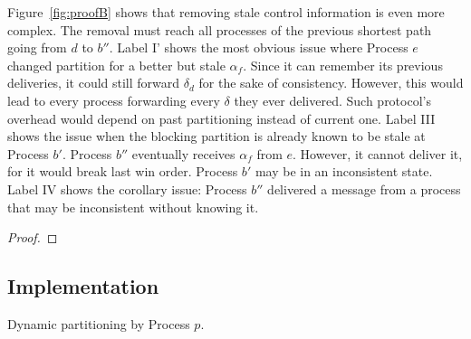 \noindent Figure~\ref{fig:proofB} shows that removing stale control
information is even more complex. The removal must reach all processes
of the previous shortest path going from $d$ to $b''$. Label I' shows
the most obvious issue where Process $e$ changed partition for a
better but stale $\alpha_f$. Since it can remember its previous
deliveries, it could still forward $\delta_d$ for the sake of
consistency. However, this would lead to every process forwarding
every $\delta$ they ever delivered. Such protocol's overhead would
depend on past partitioning instead of current one. Label III shows
the issue when the blocking partition is already known to be stale at
Process $b'$. Process $b''$ eventually receives $\alpha_f$ from
$e$. However, it cannot deliver it, for it would break last win order.
Process $b'$ may be in an inconsistent state. Label IV shows the
corollary issue: Process $b''$ delivered a message from a process that
may be inconsistent without knowing it.


\begin{theorem}
\end{theorem}

\begin{proof}
\end{proof}



\subsection{Implementation}

\begin{algorithm}
  
  \caption{\label{algo:adddelundo}Dynamic partitioning by Process $p$.}
\end{algorithm}

